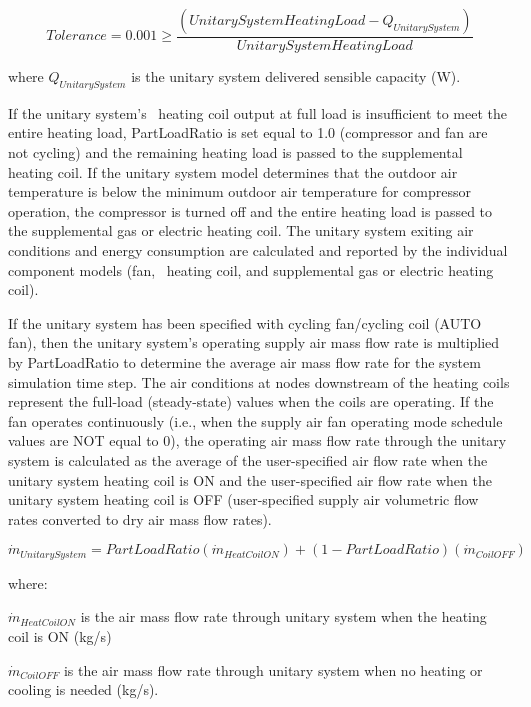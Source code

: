 \begin{equation}
Tolerance = 0.001 \ge \frac{{\left( {UnitarySystemHeatingLoad - {Q_{UnitarySystem}}} \right)}}{{UnitarySystemHeatingLoad}}
\end{equation}

where \({Q_{UnitarySystem}}\) is the unitary system delivered sensible capacity (W).

If the unitary system's~ heating coil output at full load is insufficient to meet the entire heating load, PartLoadRatio is set equal to 1.0 (compressor and fan are not cycling) and the remaining heating load is passed to the supplemental heating coil. If the unitary system model determines that the outdoor air temperature is below the minimum outdoor air temperature for compressor operation, the compressor is turned off and the entire heating load is passed to the supplemental gas or electric heating coil. The unitary system exiting air conditions and energy consumption are calculated and reported by the individual component models (fan,~ heating coil, and supplemental gas or electric heating coil).

If the unitary system has been specified with cycling fan/cycling coil (AUTO fan), then the unitary system's operating supply air mass flow rate is multiplied by PartLoadRatio to determine the average air mass flow rate for the system simulation time step. The air conditions at nodes downstream of the heating coils represent the full-load (steady-state) values when the coils are operating. If the fan operates continuously (i.e., when the supply air fan operating mode schedule values are NOT equal to 0), the operating air mass flow rate through the unitary system is calculated as the average of the user-specified air flow rate when the unitary system heating coil is ON and the user-specified air flow rate when the unitary system heating coil is OFF (user-specified supply air volumetric flow rates converted to dry air mass flow rates).

\begin{equation}
\dot{m}_{UnitarySystem} = PartLoadRatio\left( \dot{m}_{HeatCoilON} \right) + \left( 1 - PartLoadRatio \right)\left( \dot{m}_{CoilOFF} \right)
\end{equation}

where:

\(\dot m_{HeatCoilON}\) is the air mass flow rate through unitary system when the heating coil is ON (kg/s)

\(\dot m_{CoilOFF}\) is the air mass flow rate through unitary system when no heating or cooling is needed (kg/s).

